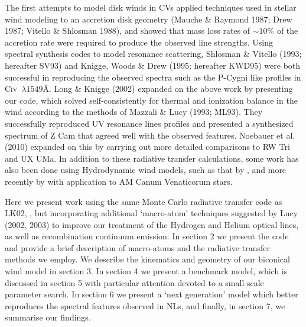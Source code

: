 \documentclass[preprint, a4paper, 11pt]{aastex}
\begin{document}
The first attempts to model disk winds in CVs applied techniques used in stellar
wind modeling to an accretion disk geometry (Mauche \& Raymond
1987; Drew 1987; Vitello \& Shlosman 1988), and showed that mass loss rates of
$\sim10\%$ of the accretion rate
were required to produce the observed line strengths.
Using spectral synthesis codes to model resonance scattering,
Shlosman \& Vitello (1993; hereafter SV93) and Knigge, Woods \& Drew (1995; hereafter KWD95)
were both successful in reproducing the observed spectra such as the P-Cygni like
profiles in C\textsc{iv}~$\lambda1549$\AA.
Long \& Knigge (2002) expanded on the above work by presenting our code, which
solved self-consistently for thermal and ionization balance in the wind
according to the methods of Mazzali \& Lucy (1993; ML93). They successfully reproduced
UV resonance lines profiles and presented a synthesized spectrum of Z Cam
that agreed well with the observed features. Noebauer et al. (2010) expanded on this
by carrying out more detailed comparisons to RW Tri and UX UMa. In addition to these 
radiative transfer calculations, some work has also been done using Hydrodynamic wind models, 
such as that by \cite{pkdh2002}, and more recently by \cite{kusterer2014} with application to
AM Canum Venaticorum stars.


Here we present work using the same Monte Carlo radiative transfer code as LK02, \py, but incorporating additional 
`macro-atom' techniques suggested by Lucy (2002, 2003) to improve our treatment of the Hydrogen and Helium
optical lines, as well as recombination continuum emission. 
In section 2 we present the code
and provide a brief description of macro-atoms and the radiative transfer methods we employ. 
We describe the kinematics and geometry of our biconical wind model in section 3.
In section 4 we present a benchmark model, which is discussed in section 5 with particular attention 
devoted to a small-scale parameter search. In section 6 we present a `next generation'
model which better reproduces the spectral features observed in NLs, and 
finally, in section 7, we summarise our findings.








%
%
\end{document}
